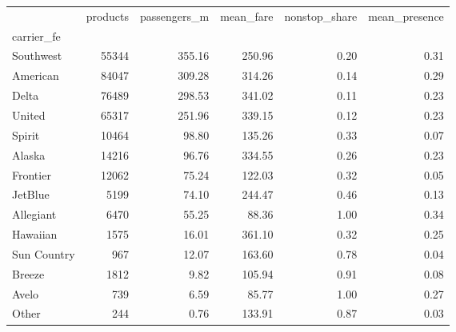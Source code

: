 \begin{tabular}{lrrrrr}
\toprule
 & products & passengers\_m & mean\_fare & nonstop\_share & mean\_presence \\
carrier\_fe &  &  &  &  &  \\
\midrule
Southwest & 55344 & 355.16 & 250.96 & 0.20 & 0.31 \\
American & 84047 & 309.28 & 314.26 & 0.14 & 0.29 \\
Delta & 76489 & 298.53 & 341.02 & 0.11 & 0.23 \\
United & 65317 & 251.96 & 339.15 & 0.12 & 0.23 \\
Spirit & 10464 & 98.80 & 135.26 & 0.33 & 0.07 \\
Alaska & 14216 & 96.76 & 334.55 & 0.26 & 0.23 \\
Frontier & 12062 & 75.24 & 122.03 & 0.32 & 0.05 \\
JetBlue & 5199 & 74.10 & 244.47 & 0.46 & 0.13 \\
Allegiant & 6470 & 55.25 & 88.36 & 1.00 & 0.34 \\
Hawaiian & 1575 & 16.01 & 361.10 & 0.32 & 0.25 \\
Sun Country & 967 & 12.07 & 163.60 & 0.78 & 0.04 \\
Breeze & 1812 & 9.82 & 105.94 & 0.91 & 0.08 \\
Avelo & 739 & 6.59 & 85.77 & 1.00 & 0.27 \\
Other & 244 & 0.76 & 133.91 & 0.87 & 0.03 \\
\bottomrule
\end{tabular}
\par\vspace{2pt}{\footnotesize Passengers in millions (DB1B sample $\times$ 10), all quarters.}
